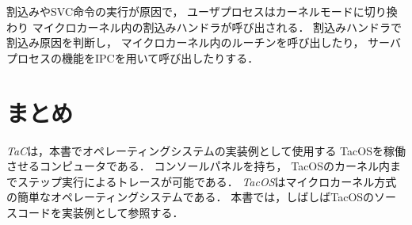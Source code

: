 割込みやSVC命令の実行が原因で，
ユーザプロセスはカーネルモードに切り換わり
マイクロカーネル内の割込みハンドラが呼び出される．
割込みハンドラで割込み原因を判断し，
マイクロカーネル内のルーチンを呼び出したり，
サーバプロセスの機能をIPCを用いて呼び出したりする．

\section{まとめ}
\emph{TaC}は，本書でオペレーティングシステムの実装例として使用する
TacOSを稼働させるコンピュータである．
コンソールパネルを持ち，
TacOSのカーネル内までステップ実行によるトレースが可能である．
\emph{TacOS}はマイクロカーネル方式の簡単なオペレーティングシステムである．
本書では，しばしばTacOSのソースコードを実装例として参照する．
